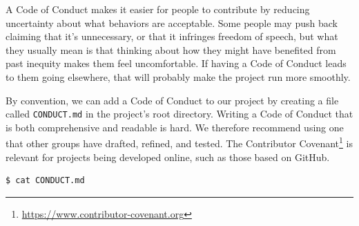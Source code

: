 \documentclass[
]{krantz}
\renewcommand{\href}[2]{#2\footnote{\url{#1}}}
\begin{document}
A Code of Conduct makes it easier for people to contribute
by reducing uncertainty about what behaviors are acceptable.
Some people may push back claiming that it's unnecessary,
or that it infringes freedom of speech,
but what they usually mean is that
thinking about how they might have benefited from past inequity makes them feel uncomfortable.
If having a Code of Conduct leads to them going elsewhere,
that will probably make the project run more smoothly.

By convention,
we can add a Code of Conduct to our project
by creating a file called \texttt{CONDUCT.md} in the project's root directory.
Writing a Code of Conduct that is both comprehensive and readable is hard.
We therefore recommend using one that other groups have drafted, refined, and tested.
The \href{https://www.contributor-covenant.org}{Contributor Covenant} is relevant for projects being developed online,
such as those based on GitHub.

\begin{verbatim}
$ cat CONDUCT.md
\end{verbatim}
\end{document}
